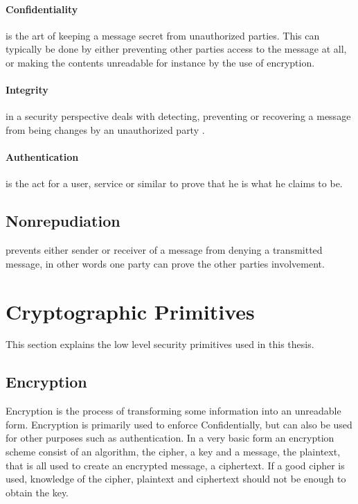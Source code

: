 \documentclass[pdftex,english,10pt,b5paper,twoside]{book}
\begin{document}
\paragraph{Confidentiality} is the art of keeping a message secret from
unauthorized parties\cite[p. 18]{stallings}. This can typically be done by
either preventing other parties access to the message at all, or making the
contents unreadable for instance by the use of encryption. 

\paragraph{Integrity} in a security perspective deals with detecting,
preventing or recovering a message from being changes by an unauthorized party
\cite{stallings}.

\paragraph{Authentication} is the act for a user, service or similar to prove
that he is what he claims to be\cite{stallings}. 

\subsection{Nonrepudiation} prevents either sender or receiver of a message
from denying a transmitted message, in other words one party can prove the
other parties involvement\cite{stallings}.

\section{Cryptographic Primitives}
This section explains the low level security primitives used in this thesis.

\subsection{Encryption}
Encryption is the process of transforming some information into an unreadable
form. Encryption is primarily used to enforce Confidentially, but can also be
used for other purposes such as authentication. In a very basic form an
encryption scheme consist of an algorithm, the cipher, a key and a message, the
plaintext, that is all used to create an encrypted message, a ciphertext. If
a good cipher is used, knowledge of the cipher, plaintext and ciphertext should
not be enough to obtain the key.
\end{document}
